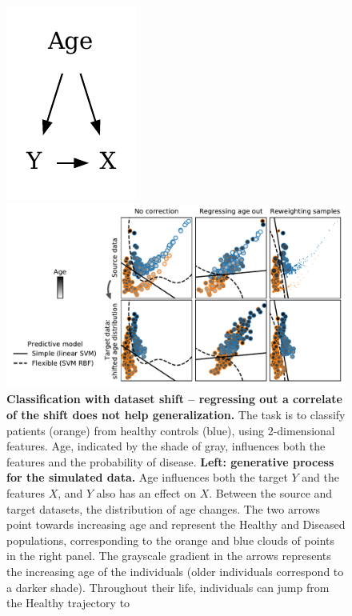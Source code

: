 \documentclass[twocolumn]{article}
\begin{document}
\begin{figure}[t!]
\begin{minipage}{.44\textwidth}
    \hspace*{.05\linewidth}%
    \includegraphics[width=.23\textwidth]{parabolas_dataset.pdf}
  \end{minipage}%
  \hspace{-.2\textwidth}%
  \begin{minipage}{.69\textwidth}
    \includegraphics[width=\textwidth]{parabolas.pdf}
  \end{minipage}%
\caption{\label{fig:parabolas} %
  \textbf{Classification with dataset shift -- regressing out a correlate of the
shift does not help generalization.} The task is to classify patients
(orange) from healthy controls (blue), using
2-dimensional features. Age, indicated by the shade of gray, influences
both the features and the probability of disease.
  \textbf{Left: generative process for the simulated data.} Age influences
  both the target \(Y\) and the features \(X\), and \(Y\) also has an effect on
  \(X\). Between the source and target datasets, the distribution of age
  changes.
  The two arrows point towards increasing age and represent the Healthy and
  Diseased populations, corresponding to the orange and blue clouds of
  points in the right panel.
  The grayscale gradient in the arrows represents the increasing age of
the individuals (older individuals correspond to a darker shade).
  Throughout their life, individuals can jump from the Healthy trajectory to
}
\end{figure}
\end{document}
